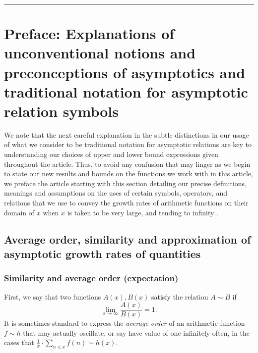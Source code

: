 \documentclass[11pt,reqno,a4letter]{article}
\numberwithin{figure}{section}
\numberwithin{table}{section}
\newcommand{\cf}{\textit{cf.\ }}
\theoremstyle{plain}
\numberwithin{theorem}{section}
\theoremstyle{definition}
\begin{document}
\bigskip\hrule\bigskip

\newpage
\label{Appendix_Glossary_NotationConvs}
     \vskip 0in
     \printglossary[type={symbols},
                    title={Reference on special notation and other conventions},
                    style={glossstyleSymbol},
                    nogroupskip=true]



\newpage
\section{Preface: Explanations of unconventional notions and preconceptions of asymptotics and 
         traditional notation for asymptotic relation symbols} 

We note that the next careful explanation in the subtle distinctions in our usage of 
what we consider to be traditional notation for asymptotic relations are key to 
understanding our choices of upper and lower bound expressions given throughout the article. 
Thus, to avoid any confusion that may linger as we begin to state our new results and bounds on the 
functions we work with in this article, we preface the article starting with this section detailing 
our precise definitions, meanings and assumptions on the uses of certain symbols, operators, and 
relations that we use to convey the growth rates of arithmetic functions on their domain of $x$
when $x$ is taken to be very large, and tending to infinity 
\cite[\cf \S 2]{NISTHB} \cite{ACOMB-BOOK}. 

\subsection{Average order, similarity and approximation of asymptotic growth rates of quantities} 

\subsubsection{Similarity and average order (expectation)} 

First, we say that two functions $A(x), B(x)$ satisfy the relation $A \sim B$ if 
\[
\lim_{x \rightarrow \infty} \frac{A(x)}{B(x)} = 1. 
\] 
It is sometimes standard to express the \emph{average order} of an arithmetic function 
$f \sim h$ that may actually oscillate, or say have value of one infinitely often, 
in the cases that $\frac{1}{x} \cdot \sum_{n \leq x} f(n) \sim h(x)$. 
\end{document}
